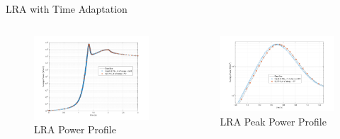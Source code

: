 \documentclass[8pt,xcolor=dvipnames]{beamer}
\begin{document}
\begin{frame}{LRA with Time Adaptation}

\begin{columns}

\begin{figure}
\includegraphics[width=\linewidth]{figures/LRA_DT2.png}
\caption{LRA Power Profile}
\end{figure}

\begin{figure}
\includegraphics[width=\linewidth]{figures/LRA_DT2_peak.png}
\caption{LRA Peak Power Profile}
\end{figure}

\end{columns}


\end{frame}
\end{document}
